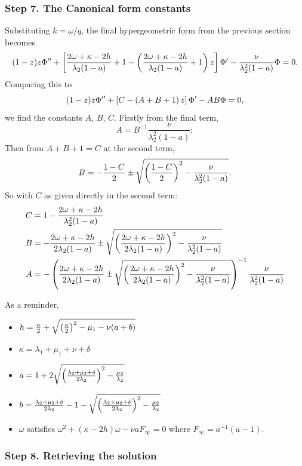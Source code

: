 \subsubsection{Step 7. The Canonical form constants}


Substituting $k = \omega / q$, the final hypergeometric form from the previous section becomes
$$ (1-z)z \Phi'' + \left[ \frac{2\omega + \kappa - 2h}{\lambda_2 (1-a)} +1  - \left(    \frac{2\omega + \kappa - 2h}{\lambda_2 (1-a)} + 1    \right) z \right]\Phi' - \frac{\nu}{\lambda_2^2(1-a)}\Phi = 0.
$$
Comparing this to
$$ (1-z)z \Phi'' + \left[ C  - \left(  A + B + 1  \right) z \right]\Phi' -AB\Phi = 0,
$$
we find the constants $A$, $B$, $C$. Firstly from the final term,
$$A = B^{-1} \frac{\nu}{\lambda_2^2(1-a)};$$ 
Then from $A+B+1 = C$ at the second term,
$$B = -\frac{1-C}{2} \pm \sqrt{\left(\frac{1-C}{2}\right)^2 -  \frac{\nu}{\lambda_2^2(1-a)}}.$$
So with $C$ as given directly in the second term:
\begin{align*}
C &=   1 - \frac{2\omega + \kappa - 2h}{\lambda_2^2 (1-a)} \\
B  &=  -\frac{2\omega + \kappa - 2h}{2\lambda_2(1-a)}  \pm \sqrt{\left(\frac{2\omega + \kappa - 2h}{2\lambda_2(1-a)}\right)^2 - \frac{\nu}{\lambda_2^2 (1-a)}}  \\
A   &=      -\left(\frac{2\omega + \kappa - 2h}{2\lambda_2(1-a)}  \pm \sqrt{\left(\frac{2\omega + \kappa - 2h}{2\lambda_2(1-a)}\right)^2 - \frac{\nu}{\lambda_2^2 (1-a)}}\right)^{-1}\frac{\nu}{\lambda_2^2 (1-a)}
\end{align*}



As a reminder,

\begin{itemize}
\item $h = \frac{\kappa}{2} + \sqrt{\left(\frac{\kappa}{2}\right)^2 - \mu_1 - \nu(a+b)}$
\item $\kappa  = \lambda_1 + \mu_1 + \nu + \delta$
\item $a = 1 + 2\sqrt{\left(\frac{\lambda_2+\mu_2+\delta}{2\lambda_2}\right)^2 - \frac{\mu_2}{\lambda_2}}$
\item $b = \frac{\lambda_2+\mu_2+\delta}{2\lambda_2} -1 - \sqrt{\left(\frac{\lambda_2+\mu_2+\delta}{2\lambda_2}\right)^2 - \frac{\mu_2}{\lambda_2}} $
\item $\omega$ satisfies $\omega^2 + (\kappa - 2h) \omega - \nu a F_\infty = 0$ where $F_\infty = a^{-1}(a-1).$
\end{itemize}





\subsubsection{Step 8. Retrieving the solution}


